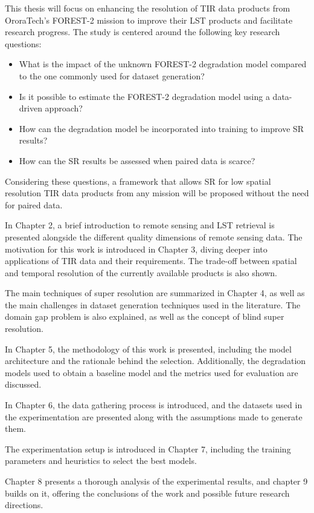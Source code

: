 This thesis will focus on enhancing the resolution of TIR data products from OroraTech's FOREST-2 mission to improve their LST products and facilitate research progress. The study is centered around the following key research questions:

\begin{itemize}
    \item What is the impact of the unknown FOREST-2 degradation model compared to the one commonly used for dataset generation?
    \item Is it possible to estimate the FOREST-2 degradation model using a data-driven approach?
    \item How can the degradation model be incorporated into training to improve SR results?
    \item  How can the SR results be assessed when paired data is scarce?
\end{itemize}

Considering these questions, a framework that allows SR for low spatial resolution TIR data products from any mission will be proposed without the need for paired data.
 
In Chapter 2, a brief introduction to remote sensing and LST retrieval is presented alongside the different quality dimensions of remote sensing data. The motivation for this work is introduced in Chapter 3, diving deeper into applications of TIR data and their requirements. The trade-off between spatial and temporal resolution of the currently available products is also shown.

The main techniques of super resolution are summarized in Chapter 4, as well as the main challenges in dataset generation techniques used in the literature.
The domain gap problem is also explained, as well as the concept of blind super resolution.

In Chapter 5,  the methodology of this work is presented, including the model architecture and the rationale behind the selection. Additionally, the degradation models used to obtain a baseline model and the metrics used for evaluation are discussed.

In Chapter 6, the data gathering process is introduced, and the datasets used in the experimentation are presented along with the assumptions made to generate them.

The experimentation setup is introduced in Chapter 7, including the training parameters and heuristics to select the best models.

Chapter 8 presents a thorough analysis of the experimental results, and chapter 9 builds on it, offering the conclusions of the work and possible future research directions.

